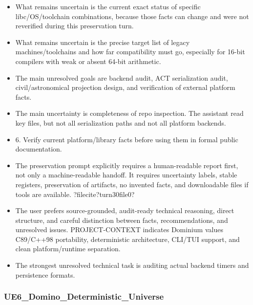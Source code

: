 \documentclass[11pt,a4paper]{report}
\begin{document}
\begin{itemize}
\item What remains uncertain is the current exact status of specific libc/OS/toolchain combinations, because those facts can change and were not reverified during this preservation turn.
\item What remains uncertain is the precise target list of legacy machines/toolchains and how far compatibility must go, especially for 16-bit compilers with weak or absent 64-bit arithmetic.
\item The main unresolved goals are backend audit, ACT serialization audit, civil/astronomical projection design, and verification of external platform facts.
\item The main uncertainty is completeness of repo inspection. The assistant read key files, but not all serialization paths and not all platform backends.
\item 6. Verify current platform/library facts before using them in formal public documentation.
\item The preservation prompt explicitly requires a human-readable report first, not only a machine-readable handoff. It requires uncertainty labels, stable registers, preservation of artifacts, no invented facts, and downloadable files if tools are available. ?filecite?turn30file0?
\item The user prefers source-grounded, audit-ready technical reasoning, direct structure, and careful distinction between facts, recommendations, and unresolved issues. PROJECT-CONTEXT indicates Dominium values C89/C++98 portability, deterministic architecture, CLI/TUI support, and clean platform/runtime separation.
\item The strongest unresolved technical task is auditing actual backend timers and persistence formats.
\end{itemize}

\subsubsection{UE6\_Domino\_Deterministic\_Universe}
\end{document}
